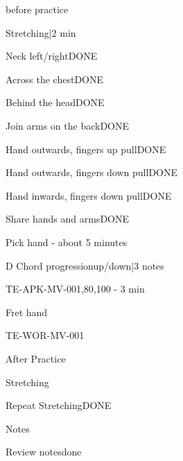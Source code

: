 
\usepackage{wasysym}

\newcommand{\beat}[1]{\quarternote=#1}




\begin{task}{before practice}
  \begin{checklist}{Stretching|2 min}
    \item{Neck left/right}{DONE}
    \item{Across the chest}{DONE}
    \item{Behind the head}{DONE}
    \item{Join arms on the back}{DONE}
    \item{Hand outwards, fingers up pull}{DONE}
    \item{Hand outwards, fingers down pull}{DONE}
    \item{Hand inwards, fingers down pull}{DONE}
    \item{Share hands and arms}{DONE}
  \end{checklist}

  \begin{checklist}{Pick hand - about 5 minutes}
    \item{D Chord progression}{up/down|3 notes}
    \item{TE-APK-MV-001}{\beat{60,80,100} - 3 min}
  \end{checklist}

  \begin{checklist}{Fret hand}
    \item{TE-WOR-MV-001}{\beat{80}}
  \end{checklist}

\end{task}

\begin{task}{After Practice}
  \begin{checklist}{Stretching}
    \item{Repeat Stretching}{DONE}
  \end{checklist}
  \begin{checklist}{Notes}
    \item{Review notes}{done}
  \end{checklist}
\end{task}

